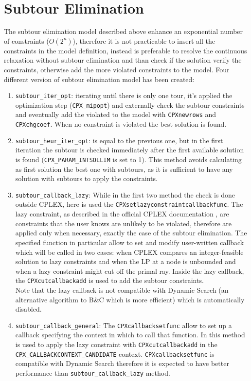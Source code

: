 \section{Subtour Elimination}\label{sec:subtour}
The subtour elimination model described above enhance an exponential number of constraints ($ O(2^n) $), therefore it is not practicable to insert all the constraints in the model definition, instead is preferable to resolve the continuous relaxation without subtour elimination and than check if the solution verify the constraints, otherwise add the more violated constraints to the model. Four different version of subtour elimination model has been created:
\begin{enumerate}
	\item \texttt{subtour\_iter\_opt}: iterating until there is only one tour, it's applied the optimization step (\texttt{CPX\_mipopt}) and externally check the subtour constraints and eventually add the violated to the model with \texttt{CPXnewrows} and \texttt{CPXchgcoef}. When no constraint is violated the best solution is found.
	\item \texttt{subtour\_heur\_iter\_opt}: is equal to the previous one, but in the first iteration the subtour is checked immediately after the first available solution is found (\texttt{CPX\_PARAM\_INTSOLLIM} is set to 1). This method avoids calculating as first solution the best one with subtours, as it is sufficient to have any solution with subtours to apply the constraints. \\
	\item \texttt{subtour\_callback\_lazy}: While in the first two method the check is done outside CPLEX, here is used the \texttt{CPXsetlazyconstraintcallbackfunc}. The lazy constraint, as described in the official CPLEX documentation \cite{IBMILOGCPLEX}, are constraints that the user knows are unlikely to be violated, therefore are applied only when necessary, exactly the case of the subtour elimination. The specified function in particular allow to set and modify user-written callback which will be called in two cases: when CPLEX compares an integer-feasible solution to lazy constraints and when the LP at a node is unbounded and when a lazy constraint might cut off the primal ray. Inside the lazy callback, the \texttt{CPXcutcallbackadd} is used to add the subtour constraints. \\ Note that the lazy callback is not compatible with Dynamic Search (an alternative algorithm to B\&C which is more efficient) which is automatically disabled.
	\item \texttt{subtour\_callback\_general}: The \texttt{CPXcallbacksetfunc} allow to set up a callback specifying the context in which to call that function. In this method is used to apply the lazy constraint with \texttt{CPXcutcallbackadd} in the \texttt{CPX\_CALLBACKCONTEXT\_CANDIDATE} context. \texttt{CPXcallbacksetfunc} is compatible with Dynamic Search therefore it is expected to have better performance than \texttt{subtour\_callback\_lazy} method.
\end{enumerate} 

